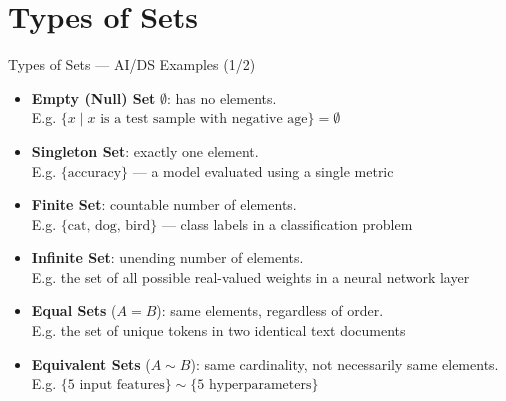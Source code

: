 \documentclass[10pt]{beamer}
\begin{document}
\section{Types of Sets}
\begin{frame}{Types of Sets --- AI/DS Examples (1/2)}
  \scriptsize
  \begin{itemize}
    \item \textbf{Empty (Null) Set} $\emptyset$: has no elements.
    \\ E.g. $\{x \mid x \text{ is a test sample with negative age}\} = \emptyset$
    \item \textbf{Singleton Set}: exactly one element.
    \\ E.g. $\{\text{accuracy}\}$ --- a model evaluated using a single metric
    \item \textbf{Finite Set}: countable number of elements.
    \\ E.g. $\{\text{cat, dog, bird}\}$ --- class labels in a classification problem
    \item \textbf{Infinite Set}: unending number of elements.
    \\ E.g. the set of all possible real-valued weights in a neural network layer
    \item \textbf{Equal Sets} ($A = B$): same elements, regardless of order.
    \\ E.g. the set of unique tokens in two identical text documents
    \item \textbf{Equivalent Sets} ($A \sim B$): same cardinality, not necessarily same elements.
    \\ E.g. $\{5 \text{ input features}\} \sim \{5 \text{ hyperparameters}\}$
  \end{itemize}
\end{frame}
\end{document}
